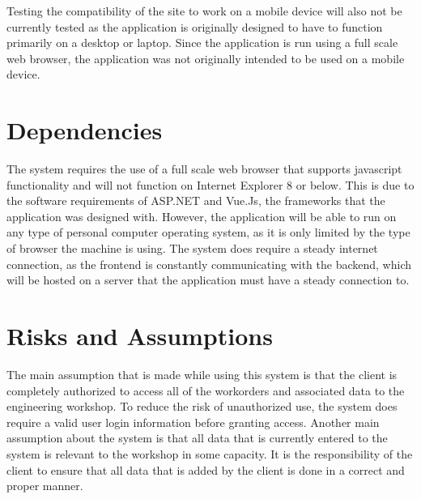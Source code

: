 {{{{{{{{{{Testing the compatibility of the site to work on a mobile device will also not be currently tested as the application is originally designed to have to function primarily on a desktop or laptop. Since the application is run using a full scale web browser, the application was not originally intended to be used on a mobile device.

\section{Dependencies}
The system requires the use of a full scale web browser that supports javascript functionality and will not function on Internet Explorer 8 or below. This is due to the software requirements of ASP.NET and Vue.Js, the frameworks that the application was designed with. However, the application will be able to run on any type of personal computer operating system, as it is only limited by the type of browser the machine is using. The system does require a steady internet connection, as the frontend is constantly communicating with the backend, which will be hosted on a server that the application must have a steady connection to. 

\section{Risks and Assumptions}
The main assumption that is made while using this system is that the client is completely authorized to access all of the workorders and associated data to the engineering workshop. To reduce the risk of unauthorized use, the system does require a valid user login information before granting access. Another main assumption about the system is that all data that is currently entered to the system is relevant to the workshop in some capacity. It is the responsibility of the client to ensure that all data that is added by the client is done in a correct and proper manner.  

}}}}}}}}}}
